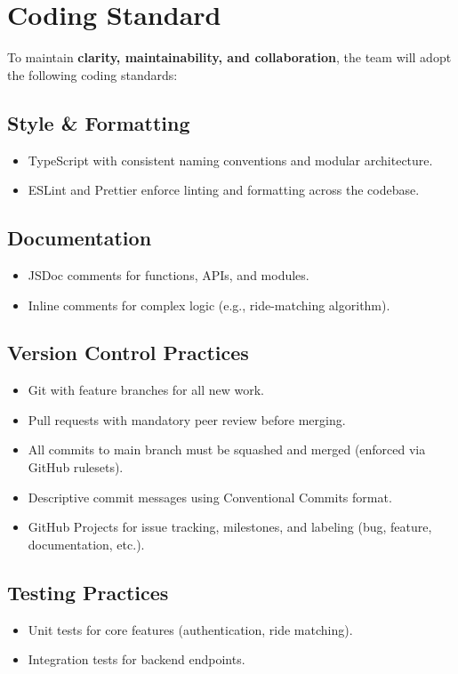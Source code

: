 \documentclass{article}
\begin{document}
\section{Coding Standard}


To maintain \textbf{clarity, maintainability, and collaboration}, the team will adopt the following coding standards:

\subsection*{Style \& Formatting}
\begin{itemize}
    \item TypeScript with consistent naming conventions and modular architecture.
    \item ESLint and Prettier enforce linting and formatting across the codebase.
\end{itemize}

\subsection*{Documentation}
\begin{itemize}
    \item JSDoc comments for functions, APIs, and modules.
    \item Inline comments for complex logic (e.g., ride-matching algorithm).
\end{itemize}

\subsection*{Version Control Practices}
\begin{itemize}
    \item Git with feature branches for all new work.
    \item Pull requests with mandatory peer review before merging.
    \item All commits to main branch must be squashed and merged (enforced via GitHub rulesets).
    \item Descriptive commit messages using Conventional Commits format.
    \item GitHub Projects for issue tracking, milestones, and labeling (bug, feature, documentation, etc.).
\end{itemize}

\subsection*{Testing Practices}
\begin{itemize}
    \item Unit tests for core features (authentication, ride matching).
    \item Integration tests for backend endpoints.
\end{itemize}
\end{document}
